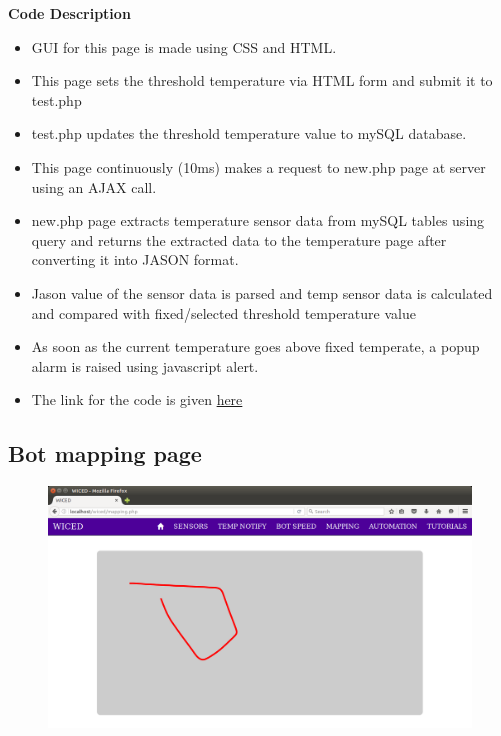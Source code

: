 \documentclass[a4paper,12pt,oneside]{book}
\begin{document}
  \textbf{Code Description}
 \begin{itemize}
        \item GUI for this page is made using CSS and HTML.
        \item This page sets the threshold temperature via HTML form and submit it to test.php
        \item test.php updates the threshold temperature value to mySQL database.
        \item This page continuously (10ms) makes a request to new.php page at server using an AJAX call.
        \item new.php page extracts temperature sensor data from mySQL tables using query and returns the extracted data to the temperature page after converting it into JASON format.
        
        \item Jason value of the sensor data is parsed and temp sensor data is calculated and compared with fixed/selected threshold temperature value
        \item As soon as the current temperature goes above fixed temperate, a popup alarm is raised using javascript alert.
        
        \item The link for the code is given \href{https://github.com/eYSIP-2016/Wiced-Sense/blob/master/Codes/wiced%20web/javascript/temp.js}{here}
        \end{itemize}



























\newpage
\subsection{Bot mapping page}

\begin{figure}[h]
        \centering
    	\includegraphics[scale=0.3]{mapping12.png}
	    \end{figure}
	    
\end{document}
